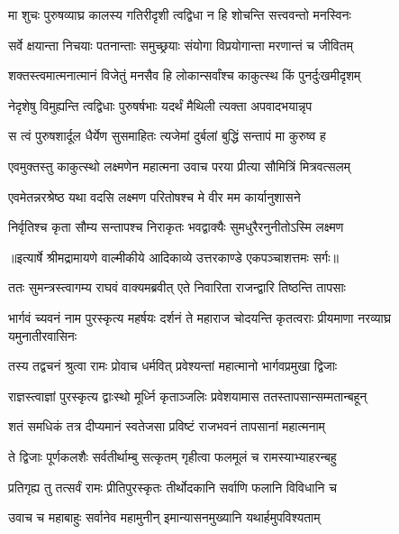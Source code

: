 \twolineshloka
{मा शुचः पुरुषव्याघ्र कालस्य गतिरीदृशी}
{त्वद्विधा न हि शोचन्ति सत्त्ववन्तो मनस्विनः} %

\twolineshloka
{सर्वे क्षयान्ता निचयाः पतनान्ताः समुच्छ्रयाः}
{संयोगा विप्रयोगान्ता मरणान्तं च जीवितम्} %

\twolineshloka
{शक्तस्त्वमात्मनात्मानं विजेतुं मनसैव हि}
{लोकान्सर्वांश्च काकुत्स्थ किं पुनर्दुःखमीदृशम्} %

\twolineshloka
{नेदृशेषु विमुह्यन्ति त्वद्विधाः पुरुषर्षभाः}
{यदर्थं मैथिली त्यक्ता अपवादभयान्नृप} %

\twolineshloka
{स त्वं पुरुषशार्दूल धैर्येण सुसमाहितः}
{त्यजेमां दुर्बलां बुद्धिं सन्तापं मा कुरुष्व ह} %

\twolineshloka
{एवमुक्तस्तु काकुत्स्थो लक्ष्मणेन महात्मना}
{उवाच परया प्रीत्या सौमित्रिं मित्रवत्सलम्} %

\twolineshloka
{एवमेतन्नरश्रेष्ठ यथा वदसि लक्ष्मण}
{परितोषश्च मे वीर मम कार्यानुशासने} %

\twolineshloka
{निर्वृतिश्च कृता सौम्य सन्तापश्च निराकृतः}
{भवद्वाक्यैः सुमधुरैरनुनीतोऽस्मि लक्ष्मण} %


{॥इत्यार्षे श्रीमद्रामायणे वाल्मीकीये आदिकाव्ये उत्तरकाण्डे एकपञ्चाशत्तमः सर्गः॥}


\twolineshloka
{ततः सुमन्त्रस्त्वागम्य राघवं वाक्यमब्रवीत्}
{एते निवारिता राजन्द्वारि तिष्ठन्ति तापसाः} %

\threelineshloka
{भार्गवं च्यवनं नाम पुरस्कृत्य महर्षयः}
{दर्शनं ते महाराज चोदयन्ति कृतत्वराः}
{प्रीयमाणा नरव्याघ्र यमुनातीरवासिनः} %

\twolineshloka
{तस्य तद्वचनं श्रुत्वा रामः प्रोवाच धर्मवित्}
{प्रवेश्यन्तां महात्मानो भार्गवप्रमुखा द्विजाः} %

\twolineshloka
{राज्ञस्त्वाज्ञां पुरस्कृत्य द्वाःस्थो मूर्ध्नि कृताञ्जलिः}
{प्रवेशयामास ततस्तापसान्सम्मतान्बहून्} %

\twolineshloka
{शतं समधिकं तत्र दीप्यमानं स्वतेजसा}
{प्रविष्टं राजभवनं तापसानां महात्मनाम्} %

\twolineshloka
{ते द्विजाः पूर्णकलशैः सर्वतीर्थाम्बु सत्कृतम्}
{गृहीत्वा फलमूलं च रामस्याभ्याहरन्बहु} %

\twolineshloka
{प्रतिगृह्य तु तत्सर्वं रामः प्रीतिपुरस्कृतः}
{तीर्थोदकानि सर्वाणि फलानि विविधानि च} %

\twolineshloka
{उवाच च महाबाहुः सर्वानेव महामुनीन्}
{इमान्यासनमुख्यानि यथार्हमुपविश्यताम्} %

